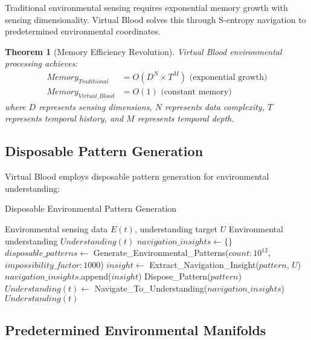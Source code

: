 \documentclass[12pt,a4paper]{article}
\newtheorem{theorem}{Theorem}
\begin{document}
Traditional environmental sensing requires exponential memory growth with sensing dimensionality. Virtual Blood solves this through S-entropy navigation to predetermined environmental coordinates.

\begin{theorem}[Memory Efficiency Revolution]
Virtual Blood environmental processing achieves:
\begin{align}
Memory_{Traditional} &= O(D^N \times T^M) \text{ (exponential growth)}\\
Memory_{Virtual\_Blood} &= O(1) \text{ (constant memory)}
\end{align}
where $D$ represents sensing dimensions, $N$ represents data complexity, $T$ represents temporal history, and $M$ represents temporal depth.
\end{theorem}

\subsection{Disposable Pattern Generation}

Virtual Blood employs disposable pattern generation for environmental understanding:

\begin{algorithm}
\caption{Disposable Environmental Pattern Generation}
\begin{algorithmic}[1]
\REQUIRE Environmental sensing data $E(t)$, understanding target $U$
\ENSURE Environmental understanding $Understanding(t)$
\STATE $navigation\_insights \leftarrow \{\}$
    \STATE $disposable\_patterns \leftarrow$ Generate\_Environmental\_Patterns($count: 10^{12}$, $impossibility\_factor: 1000$)
            \STATE $insight \leftarrow$ Extract\_Navigation\_Insight($pattern$, $U$)
            \STATE $navigation\_insights$.append($insight$)
        \ENDIF
        \STATE Dispose\_Pattern($pattern$) 
    \ENDFOR
\ENDWHILE
\STATE $Understanding(t) \leftarrow$ Navigate\_To\_Understanding($navigation\_insights$)
\RETURN $Understanding(t)$
\end{algorithmic}
\end{algorithm}

\subsection{Predetermined Environmental Manifolds}
\end{document}
